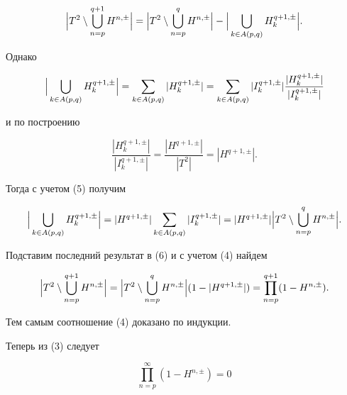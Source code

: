 \begin{equation}


\Bigl| T^2\setminus\bigcup^{q+1}_{n=p}H^{n,\pm}\Bigr|=


\Bigl| T^2\setminus\bigcup^q_{n=p}H^{n,\pm}\Bigr|-


\Bigl|\,\bigcup_{k\in A(p,q)}H^{q+1,\pm}_k\Bigr|.


\end{equation}


Однако


$$


\Bigl|\,\bigcup_{k\in A(p,q)}H^{q+1,\pm}_k\Bigr|=


\sum_{k\in A(p,q)}|H^{q+1,\pm}_k|=


\sum_{k\in A(p,q)}|I^{q+1,\pm}_k|


\frac{|H^{q+1,\pm}_k|}{|I^{q+1,\pm}_k|}


$$


и по построению


$$


\frac{|H^{q+1,\pm}_k|}{|I^{q+1,\pm}_k|}=


\frac{|H^{q+1,\pm}|}{|T^2|}=|H^{q+1,\pm}|.


$$


Тогда с учетом (5) получим


$$


\Bigl|\,\bigcup_{k\in A(p,q)}H^{q+1,\pm}_k\Bigr|=


|H^{q+1,\pm}|\sum_{k\in A(p,q)}|I^{q+1,\pm}_k|=


|H^{q+1,\pm}|\Bigl| T^2\setminus


\bigcup^q_{n=p}H^{n,\pm}\Bigr|.


$$


Подставим последний результат в (6) и с учетом (4) найдем


$$


\Bigl| T^2\setminus \bigcup^{q+1}_{n=p}H^{n,\pm}\Bigr|=


\Bigl| T^2\setminus \bigcup^q_{n=p}H^{n,\pm}\Bigr|


(1-|H^{q+1,\pm}|)=\prod^{q+1}_{n=p}(1-H^{n,\pm}).


$$


Тем самым соотношение (4) доказано по индукции.





Теперь из (3) следует


$$


\prod^\infty_{n=p}(1-H^{n,\pm})=0


$$


